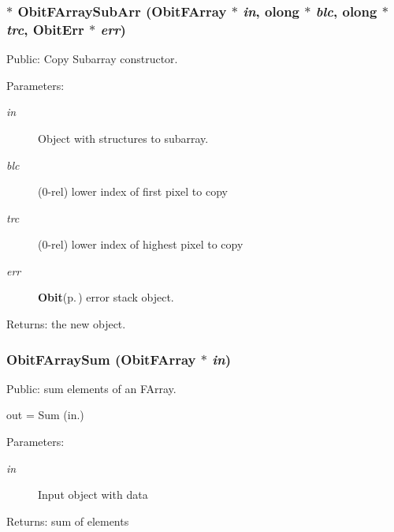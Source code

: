 \subsubsection{$\ast$ Obit\-FArray\-Sub\-Arr ({\bf Obit\-FArray} $\ast$ {\em in}, {\bf olong} $\ast$ {\em blc}, {\bf olong} $\ast$ {\em trc}, {\bf Obit\-Err} $\ast$ {\em err})}\label{ObitFArray_8c_a20}


Public: Copy Subarray constructor. 

\begin{Desc}
\item[Parameters:]
\begin{description}
\item[{\em in}]Object with structures to subarray. \item[{\em blc}](0-rel) lower index of first pixel to copy \item[{\em trc}](0-rel) lower index of highest pixel to copy \item[{\em err}]{\bf Obit}{\rm (p.\,\pageref{structObit})} error stack object. \end{description}
\end{Desc}
\begin{Desc}
\item[Returns:]the new object. \end{Desc}
\subsubsection{ Obit\-FArray\-Sum ({\bf Obit\-FArray} $\ast$ {\em in})}\label{ObitFArray_8c_a40}


Public: sum elements of an FArray. 

out = Sum (in.) \begin{Desc}
\item[Parameters:]
\begin{description}
\item[{\em in}]Input object with data \end{description}
\end{Desc}
\begin{Desc}
\item[Returns:]sum of elements \end{Desc}
